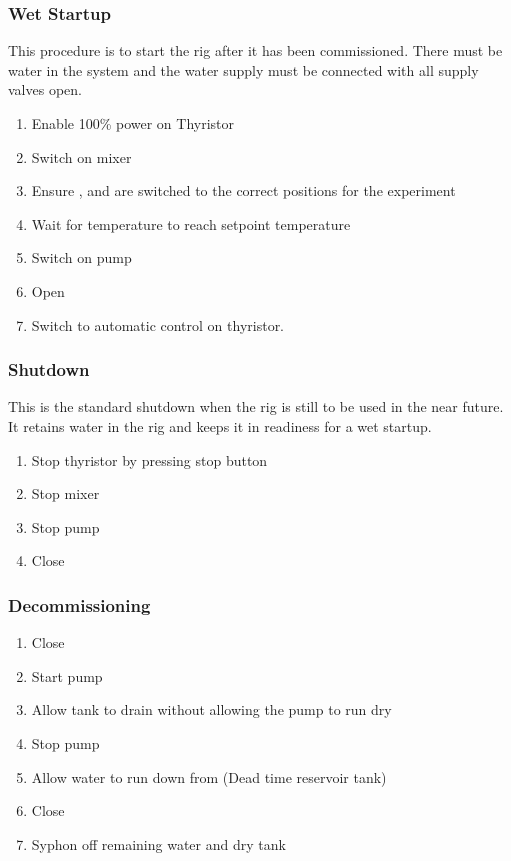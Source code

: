 \subsubsection{Wet Startup}
This procedure is to start the rig after it has been commissioned.  There must be water in the system and the water supply must be connected with all supply valves open.
\begin{enumerate}
	\item Enable 100\% power on Thyristor
	\item Switch on mixer
	\item Ensure ,  and  are switched to the correct positions for the experiment
	\item Wait for temperature to reach setpoint temperature
	\item Switch on pump
	\item Open 
	\item Switch to automatic control on thyristor.
\end{enumerate}

\subsubsection{Shutdown}
This is the standard shutdown when the rig is still to be used in the near future.  It retains water in the rig and keeps it in readiness for a wet startup.
\begin{enumerate}
	\item Stop thyristor by pressing stop button
	\item Stop mixer
	\item Stop pump
	\item Close 
\end{enumerate}

\subsubsection{Decommissioning}
\begin{enumerate}
	\item Close 
	\item Start pump
	\item Allow tank to drain without allowing the pump to run dry
	\item Stop pump
	\item Allow water to run down from  (Dead time reservoir tank)
	\item Close 
	\item Syphon off remaining water and dry tank
\end{enumerate}